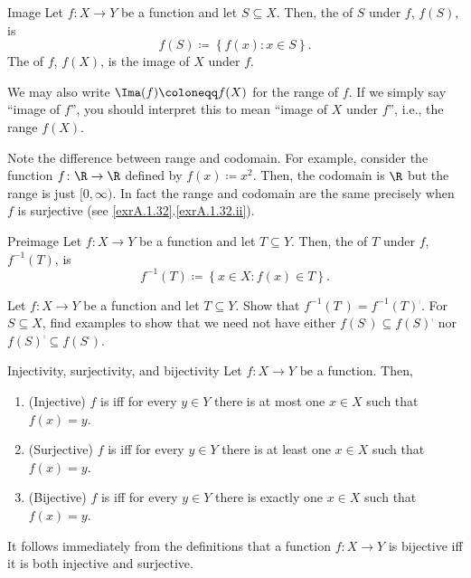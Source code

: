 \begin{dfn}{Image}{}
Let $f\colon X\rightarrow Y$ be a function and let $S\subseteq X$.  Then, the  of $S$ under $f$, $f(S)$, is
\begin{equation}
f(S)\coloneqq \left\{ f(x):x\in S\right\} .
\end{equation}
The  of $f$, $f(X)$, is the image of $X$ under $f$.
\begin{rmk}
We may also write $\Ima (f)\coloneqq f(X)$ for the range of $f$.  If we simply say ``image of $f$'', you should interpret this to mean ``image of $X$ under $f$'', i.e., the range $f(X)$.
\end{rmk}
\begin{rmk}
Note the difference between range and codomain.  For example, consider the function $f\colon \R \rightarrow \R$ defined by $f(x)\coloneqq x^2$.  Then, the codomain is $\R$ but the range is just $[0,\infty )$.  In fact the range and codomain are the same precisely when $f$ is surjective (see \cref{exrA.1.32}.\cref{exrA.1.32.ii}).
\end{rmk}
\end{dfn}
\begin{dfn}{Preimage}{}
Let $f\colon X\rightarrow Y$ be a function and let $T\subseteq Y$.  Then, the  of $T$ under $f$, $f^{-1}(T)$, is
\begin{equation}
f^{-1}(T)\coloneqq \left\{ x\in X:f(x)\in T\right\} .
\end{equation}
\end{dfn}
\begin{exr}{}{}
Let $f\colon X\rightarrow Y$ be a function and let $T\subseteq Y$.  Show that $f^{-1}(T^{\comp})=f^{-1}(T)^{\comp}$.  For $S\subseteq X$, find examples to show that we need not have either $f(S^{\comp})\subseteq f(S)^{\comp}$ nor $f(S)^{\comp}\subseteq f(S^{\comp})$.
\end{exr}
\begin{dfn}{Injectivity, surjectivity, and bijectivity}{}
Let $f\colon X\rightarrow Y$ be a function.  Then,
\begin{enumerate}
\item (Injective) $f$ is  iff for every $y\in Y$ there is at most one $x\in X$ such that $f(x)=y$.
\item (Surjective) $f$ is  iff for every $y\in Y$ there is at least one $x\in X$ such that $f(x)=y$.
\item (Bijective) $f$ is  iff for every $y\in Y$ there is exactly one $x\in X$ such that $f(x)=y$.
\end{enumerate}
\begin{rmk}
It follows immediately from the definitions that a function $f\colon X\rightarrow Y$ is bijective iff it is both injective and surjective.
\end{rmk}
\end{dfn}
